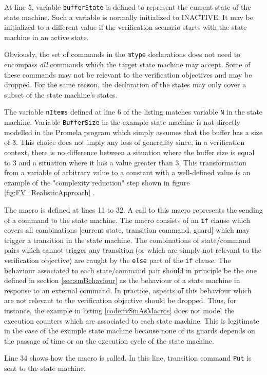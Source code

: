 \documentclass[definition]{../fwprofile}
\begin{document}
At line 5, variable \texttt{bufferState} is defined to represent the current state of the state machine. Such a variable is normally initialized to INACTIVE. It may be initialized to a different value if the verification scenario starts with the state machine in an active state.

Obviously, the set of commands in the \texttt{mtype} declarations does not need to encompass \textit{all} commands which the target state machine may accept. Some of these commands may not be relevant to the verification objectives and may be dropped. For the same reason, the declaration of the states may only cover a subset of the state machine's states.

The variable \texttt{nItems} defined at line 6 of the listing matches variable \texttt{N} in the state machine. Variable \texttt{BufferSize} in the example state machine is not directly modelled in the Promela program which simply assumes that the buffer has a size of 3. This choice does not imply any loss of generality since, in a verification context, there is no difference between a situation where the buffer size is equal to 3 and a situation where it has a value greater than 3. This transformation from a variable of arbitrary value to a constant with a well-defined value is an example of the "complexity reduction" step shown in figure \ref{fig:FV_RealisticApproach} .

The macro is defined at lines 11 to 32. A call to this macro represents the sending of a command to the state machine. The macro consists of an \texttt{if} clause which covers all combinations [current state, transition command, guard] which may trigger a transition in the state machine. The combinations of state/command pairs which cannot trigger any transition (or which are simply not relevant to the verification objective) are caught by the \texttt{else} part of the \texttt{if} clause. The behaviour associated to each state/command pair should in principle be the one defined in section \ref{sec:smBehaviour} as the behaviour of a state machine in response to an external command. In practice, aspects of this behaviour which are not relevant to the verification objective should be dropped. Thus, for instance, the example in listing \ref{code:fvSmAsMacros} does not model the execution counters which are associated to each state machine. This is legitimate in the case of the example state machine because none of its guards depends on the passage of time or on the execution cycle of the state machine.

Line 34 shows how the macro is called. In this line, transition command \texttt{Put} is sent to the state machine.
\end{document}
